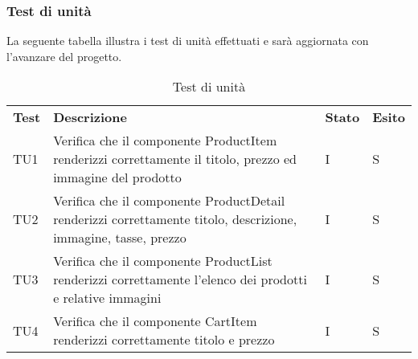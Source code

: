 \subsubsection{Test di unità}
La seguente tabella illustra i test di unità effettuati e sarà aggiornata con l'avanzare del progetto.
\begin{center}
    \centering
    \renewcommand{\arraystretch}{1.8}
    \label{tab:TestUnita}
    \begin{longtable}[!h]{p{45px} p{255px} p{35px} p{35px}}
        \caption{Test di unità}                                                                                                                                                                                                                                                                                    \\
        \rowcolor{logo!70}
        \textbf{Test} & \textbf{Descrizione}                                                                                                                                                                                                                                     & \textbf{Stato} & \textbf{Esito} \\
        TU1           & Verifica che il componente ProductItem renderizzi correttamente il titolo, prezzo ed immagine del prodotto                                                                                                                                               & I              & S              \\
        TU2           & Verifica che il componente ProductDetail renderizzi correttamente titolo, descrizione, immagine, tasse, prezzo                                                                                                                                           & I              & S              \\
        TU3           & Verifica che il componente ProductList renderizzi correttamente l'elenco dei prodotti e relative immagini                                                                                                                                                & I              & S              \\
        TU4           & Verifica che il componente CartItem renderizzi correttamente titolo e prezzo                                                                                                                                                                             & I              & S              \\

\end{longtable}
\end{center}
